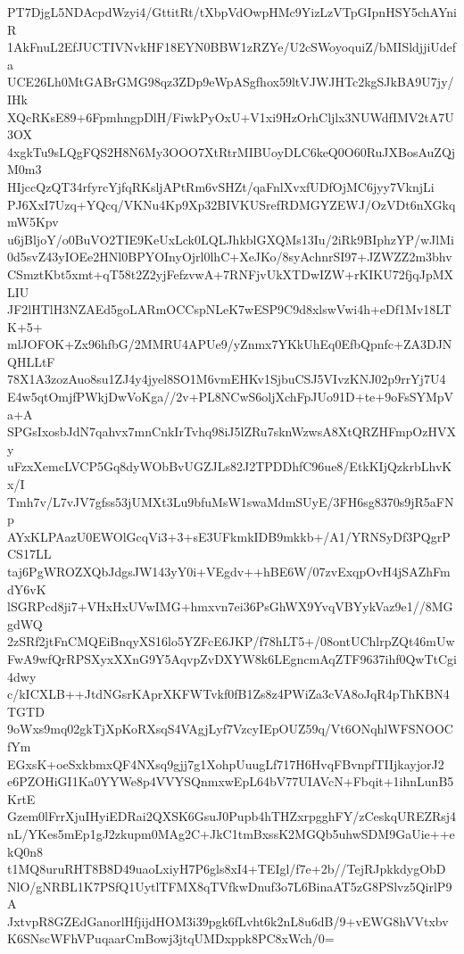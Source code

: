 PT7DjgL5NDAcpdWzyi4/GttitRt/tXbpVdOwpHMc9YizLzVTpGIpnHSY5chAYniR
1AkFnuL2EfJUCTIVNvkHF18EYN0BBW1zRZYe/U2cSWoyoquiZ/bMISldjjiUdefa
UCE26Lh0MtGABrGMG98qz3ZDp9eWpASgfhox59ltVJWJHTc2kgSJkBA9U7jy/IHk
XQcRKsE89+6FpmhngpDlH/FiwkPyOxU+V1xi9HzOrhCljlx3NUWdfIMV2tA7U3OX
4xgkTu9sLQgFQS2H8N6My3OOO7XtRtrMIBUoyDLC6keQ0O60RuJXBosAuZQjM0m3
HIjccQzQT34rfyrcYjfqRKsljAPtRm6vSHZt/qaFnlXvxfUDfOjMC6jyy7VknjLi
PJ6XxI7Uzq+YQcq/VKNu4Kp9Xp32BIVKUSrefRDMGYZEWJ/OzVDt6nXGkqmW5Kpv
u6jBljoY/o0BuVO2TIE9KeUxLck0LQLJhkblGXQMs13Iu/2iRk9BIphzYP/wJlMi
0d5svZ43yIOEe2HNl0BPYOInyOjrl0lhC+XeJKo/8syAchnrSI97+JZWZZ2m3bhv
CSmztKbt5xmt+qT58t2Z2yjFefzvwA+7RNFjvUkXTDwIZW+rKIKU72fjqJpMXLIU
JF2lHTlH3NZAEd5goLARmOCCspNLeK7wESP9C9d8xlswVwi4h+eDf1Mv18LTK+5+
mlJOFOK+Zx96hfbG/2MMRU4APUe9/yZnmx7YKkUhEq0EfbQpnfc+ZA3DJNQHLLtF
78X1A3zozAuo8su1ZJ4y4jyel8SO1M6vmEHKv1SjbuCSJ5VIvzKNJ02p9rrYj7U4
E4w5qtOmjfPWkjDwVoKga//2v+PL8NCwS6oljXchFpJUo91D+te+9oFsSYMpVa+A
SPGsIxosbJdN7qahvx7mnCnkIrTvhq98iJ5lZRu7sknWzwsA8XtQRZHFmpOzHVXy
uFzxXemcLVCP5Gq8dyWObBvUGZJLs82J2TPDDhfC96ue8/EtkKIjQzkrbLhvKx/I
Tmh7v/L7vJV7gfss53jUMXt3Lu9bfuMsW1swaMdmSUyE/3FH6sg8370s9jR5aFNp
AYxKLPAazU0EWOlGcqVi3+3+sE3UFkmkIDB9mkkb+/A1/YRNSyDf3PQgrPCS17LL
taj6PgWROZXQbJdgsJW143yY0i+VEgdv++hBE6W/07zvExqpOvH4jSAZhFmdY6vK
lSGRPcd8ji7+VHxHxUVwIMG+hmxvn7ei36PsGhWX9YvqVBYykVaz9e1//8MGgdWQ
2zSRf2jtFnCMQEiBnqyXS16lo5YZFcE6JKP/f78hLT5+/08ontUChlrpZQt46mUw
FwA9wfQrRPSXyxXXnG9Y5AqvpZvDXYW8k6LEgncmAqZTF9637ihf0QwTtCgi4dwy
c/kICXLB++JtdNGsrKAprXKFWTvkf0fB1Zs8z4PWiZa3cVA8oJqR4pThKBN4TGTD
9oWxs9mq02gkTjXpKoRXsqS4VAgjLyf7VzcyIEpOUZ59q/Vt6ONqhlWFSNOOCfYm
EGxsK+oeSxkbmxQF4NXsq9gjj7g1XohpUuugLf717H6HvqFBvnpfTIIjkayjorJ2
e6PZOHiGI1Ka0YYWe8p4VVYSQnmxwEpL64bV77UIAVcN+Fbqit+1ihnLunB5KrtE
Gzem0lFrrXjuIHyiEDRai2QXSK6GsuJ0Pupb4hTHZxrpgghFY/zCeskqUREZRsj4
nL/YKes5mEp1gJ2zkupm0MAg2C+JkC1tmBxssK2MGQb5uhwSDM9GaUie++ekQ0n8
t1MQ8uruRHT8B8D49uaoLxiyH7P6gls8xI4+TEIgl/f7e+2b//TejRJpkkdygObD
NlO/gNRBL1K7PSfQ1UytlTFMX8qTVfkwDnuf3o7L6BinaAT5zG8PSlvz5QirlP9A
JxtvpR8GZEdGanorlHfjijdHOM3i39pgk6fLvht6k2nL8u6dB/9+vEWG8hVVtxbv
K6SNscWFhVPuqaarCmBowj3jtqUMDxppk8PC8xWch/0=
